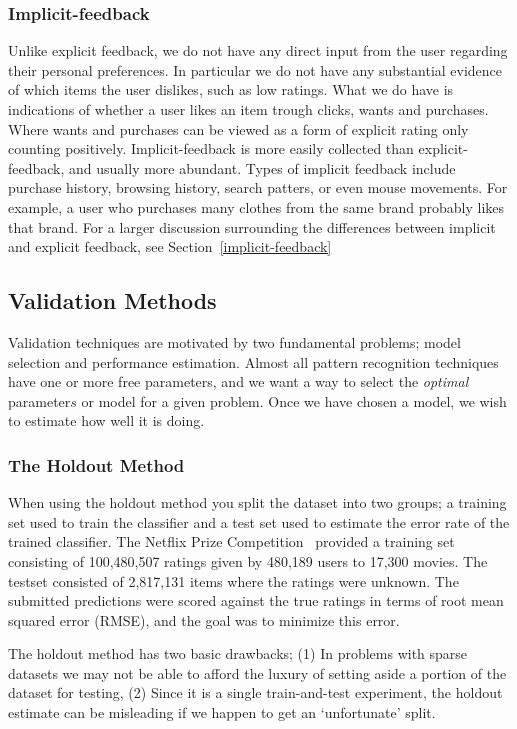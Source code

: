 \subsubsection{Implicit-feedback}
Unlike explicit feedback, we do not have any direct input from the user
regarding their personal preferences. In particular we do not have any
substantial evidence of which items the user dislikes, such as low ratings.
What we do have is indications of whether a user likes an item trough clicks, wants and purchases. Where wants and purchases can be viewed as a form of explicit rating only counting positively.
Implicit-feedback is more easily collected than explicit-feedback, and usually more abundant.
Types of implicit feedback include purchase history, browsing history,
search patters, or even mouse movements. For example, a user who purchases
many clothes from the same brand probably likes that brand. For a larger
discussion surrounding the differences between implicit and explicit
feedback, see Section~\ref{implicit-feedback}

\subsection{Validation Methods}
Validation techniques are motivated by two fundamental problems; model
selection and performance estimation. Almost all pattern recognition techniques
have one or more free parameters, and we want a way to select the
\emph{optimal} parameter\(s\) or model for a given problem. Once we have chosen a
model, we wish to estimate how well it is doing.

\subsubsection{The Holdout Method}
When using the holdout method you split the dataset into two groups; a training
set used to train the classifier and a test set used to estimate the error rate
of the trained classifier. The Netflix Prize Competition~\cite{Netflix}
provided a training set consisting of 100,480,507 ratings given by 480,189
users to 17,300 movies. The testset consisted of 2,817,131 items where the
ratings were unknown. The submitted predictions were scored against the true
ratings in terms of root mean squared error (RMSE), and the goal was to
minimize this error.

The holdout method has two basic drawbacks; (1) In problems with sparse
datasets we may not be able to afford the luxury of setting aside a portion of
the dataset for testing, (2) Since it is a single train-and-test experiment,
the holdout estimate can be misleading if we happen to get an `unfortunate'
split.

